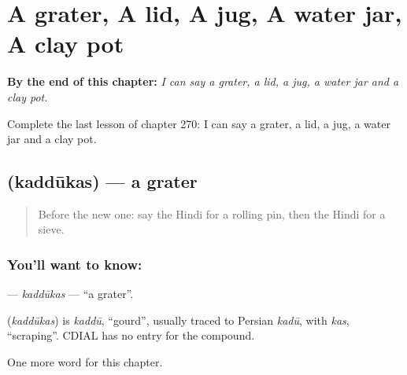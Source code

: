 
\chapter{A grater, A lid, A jug, A water jar, A clay pot}
\label{ch:hi-a-grater-a-lid-a-jug-a-water-jar-a-clay-pot}

\begin{chapteropening}
\textbf{By the end of this chapter:} \emph{I can say a grater, a lid, a jug, a water jar and a clay pot.}

Complete the last lesson of chapter 270: I can say a grater, a lid, a jug, a water jar and a clay pot.
\end{chapteropening}

\section[\texorpdfstring{\hi{कद्दूकस} (kaddūkas)}{कद्दूकस (kaddūkas)}]{ (kaddūkas) — a grater}

\label{lesson:HI-C270-kaddukas}



\begin{quote}
Before the new one: say the Hindi for a rolling pin, then the Hindi for a sieve.
\end{quote}

\subsection*{You'll want to know: }
\textbf{} — \emph{kaddūkas} — \textquotedblleft{}a grater\textquotedblright{}.

\begin{cousinweb}
\textbf{} (\emph{kaddūkas}) is \emph{kaddū}, \textquotedblleft{}gourd\textquotedblright{}, usually traced to Persian \emph{kadū}, with \emph{kas}, \textquotedblleft{}scraping\textquotedblright{}. CDIAL has no entry for the compound.
\end{cousinweb}

\begin{grammarlens}[title={What you've built}]
One more word for this chapter.
\end{grammarlens}

